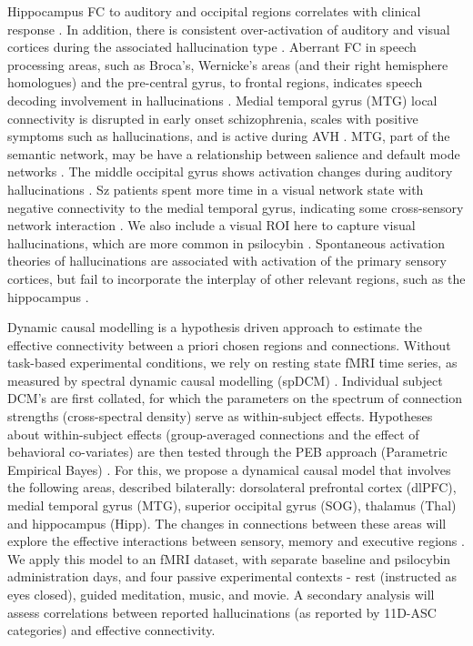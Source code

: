 \documentclass{article}
\begin{document}
Hippocampus FC to auditory and occipital regions correlates with clinical response \citep{kraguljac_aberrant_2016}. In addition, there is consistent over-activation of auditory and visual cortices during the associated hallucination type \citep{zmigrod_neural_2016}. Aberrant FC in speech processing areas, such as Broca's, Wernicke's areas (and their right hemisphere homologues) and the pre-central gyrus, to frontal regions, indicates speech decoding involvement in hallucinations \citep{fuentes-claramonte2021auditory}. Medial temporal gyrus (MTG) local connectivity is disrupted in early onset schizophrenia, scales with positive symptoms such as hallucinations, and is active during AVH \citep{li_altered_2025, jardri_cortical_2011}. MTG, part of the semantic network, may be have a relationship between salience and default mode networks \citep{briggs_unique_2021}. The middle occipital gyrus shows activation changes during auditory hallucinations \citep{zmigrod_neural_2016}. Sz patients spent more time in a visual network state with negative connectivity to the medial temporal gyrus, indicating some cross-sensory network interaction \citep{sendi_multiple_2021}.  We also include a visual ROI here to capture visual hallucinations, which are more common in psilocybin \citep{mo_network_2024}. Spontaneous activation theories of hallucinations are associated with activation of the primary sensory cortices, but fail to incorporate the interplay of other relevant regions, such as the hippocampus \citep{hare_modality-dependent_2017}. 

Dynamic causal modelling is a hypothesis driven approach to estimate the effective connectivity between a priori chosen regions and connections. Without task-based experimental conditions, we rely on resting state fMRI time series, as measured by spectral dynamic causal modelling (spDCM) \citep{friston_dcm_2014, novelli_spectral_2024}. Individual subject DCM's are first collated, for which the parameters on the spectrum of connection strengths (cross-spectral density) serve as within-subject effects. Hypotheses about within-subject effects (group-averaged connections and the effect of behavioral co-variates) are then tested through the PEB approach (Parametric Empirical Bayes) \citep{zeidman_guide_2019, stephan_ten_2010}. For this, we propose a dynamical causal model that involves the following areas, described bilaterally: dorsolateral prefrontal cortex (dlPFC), medial temporal gyrus (MTG), superior occipital gyrus (SOG), thalamus (Thal) and hippocampus (Hipp). The changes in connections between these areas will explore the effective interactions between sensory, memory and executive regions \citep{jardri_neurodynamic_2013}. We apply this model to an fMRI dataset, with separate baseline and psilocybin administration days, and four passive experimental contexts - rest (instructed as eyes closed), guided meditation, music, and movie. A secondary analysis will assess correlations between reported hallucinations (as reported by 11D-ASC categories) and effective connectivity. 
\end{document}
